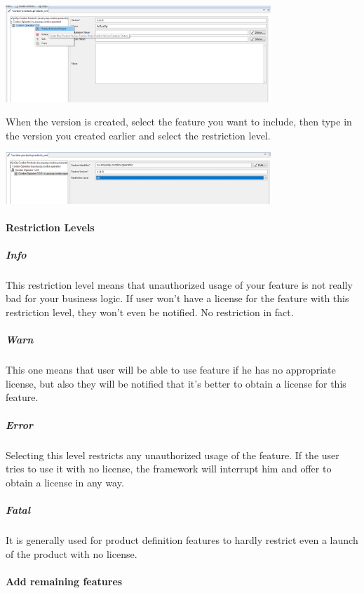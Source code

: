 \documentclass[12pt]{report}
\begin{document}
\begin{center}
    \includegraphics[width=0.75\textwidth]{product_feature_create}
\end{center}

When the version is created, select the feature you want to include, then type in the version you created earlier and select the restriction level.

\begin{center}
    \includegraphics[width=0.75\textwidth]{product_feature_created}
\end{center}

\paragraph*{Restriction Levels}

\subparagraph*{Info}
This restriction level means that unauthorized usage of your feature is not really bad for your business logic. If user won't have a license for the feature with this restriction
level, they won't even be notified. No restriction in fact.

\subparagraph*{Warn}
This one means that user will be able to use feature if he has no appropriate license, but also they will be notified that it's better to obtain a license for this feature.

\subparagraph*{Error}
Selecting this level restricts any unauthorized usage of the feature. If the user tries to use it with no license, the framework will interrupt him and offer to obtain a license in any way.

\subparagraph*{Fatal}
It is generally used for product definition features to hardly restrict even a launch of the product with no license.

\paragraph*{Add remaining features}
\end{document}
